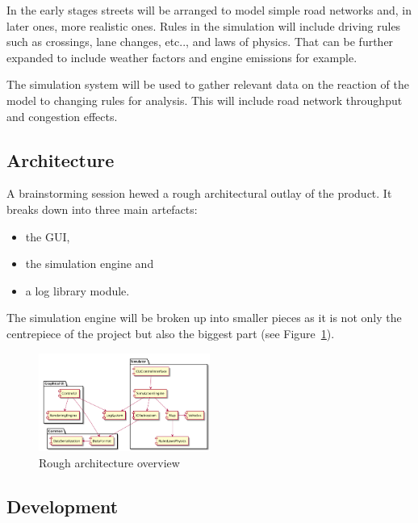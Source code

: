 \vspace{2mm}

In the early stages streets will be arranged to model simple road networks and, in later ones, more realistic ones.
Rules in the simulation will include driving rules such as crossings, lane changes, etc.., and laws of physics. That can be further expanded to include weather factors and engine emissions for example.

\vspace{2mm}

The simulation system will be used to gather relevant data on the reaction of the model to changing rules for analysis. This will include road network throughput and congestion effects.

\subsection{Architecture}

A brainstorming session hewed a rough architectural outlay of the product. It breaks down into three main artefacts:
\vspace{1mm}
\begin{itemize}
	\item the GUI,
	\item the simulation engine and
	\item a log library module.
\end{itemize}
\vspace{1mm}
The simulation engine will be broken up into smaller pieces as it is not only the centrepiece of the project but also the biggest part (see Figure~\ref{fig:arch_overview}).

\begin{figure}[h!]
	\vspace{1.5em}
  	\caption{Rough architecture overview}
  	\label{fig:arch_overview}
  	\centering
	\includegraphics[width=0.5\textwidth]{figs/arch_diagram.png}
  	\vspace{1.5em}
\end{figure}

\subsection{Development}

